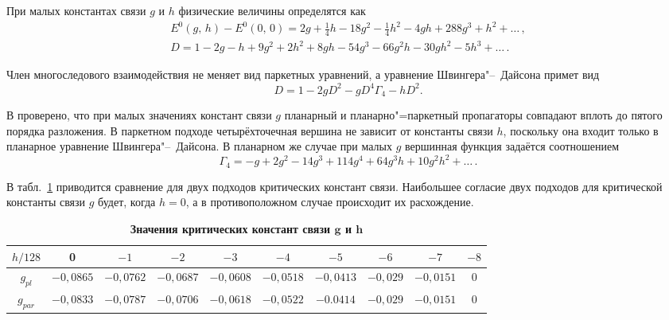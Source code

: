 При малых константах связи $g$ и $h$ физические величины определятся как
\begin{gather*}
E^0(g,\,h)-E^0(0,\,0)=2g+\frac{1}{4} h-18g^2-\frac{1}{4}
h^2-4g h + 288g^3 + h^2+ \ldots\,,\\
D=1 - 2g - h + 9g^2 + 2 h^2 + 8g h - 54g^3 - 66g^2 h - 30gh^2 - 5 h^3+ \ldots\, .
\end{gather*}

Член многоследового взаимодействия не меняет вид паркетных
уравнений, а уравнение Швингера"--~Дайсона примет вид
\begin{equation*}
D=1-2gD^2-gD^4\Gamma_4-hD^2.
\end{equation*}

В \cite{shish:sh1} проверено, что при малых значениях констант связи $g$ планарный и планарно"=паркетный пропагаторы совпадают
вплоть до пятого порядка разложения. В паркетном подходе четырёхточечная вершина не зависит от константы связи $h$, поскольку она
входит только в планарное уравнение Швингера"--~Дайсона. В планарном же случае  при малых $g$ вершинная функция задаётся
соотношением
\begin{equation*}
\Gamma_4=-g+2g^2-14g^3+114g^4+64g^3 h+10g^2 h^2+\dots\,.
\end{equation*}

В  табл.~\ref{sisk:1} приводится сравнение для двух подходов критических констант связи.
Наибольшее согласие двух подходов для критической константы связи
$g$ будет, когда $h=0$, а в противоположном случае происходит их
расхождение.

\begin{table}[h!]
\setlength{\tabcolsep}{3.5pt}
\centering \small
\caption{\bf Значения критических констант связи $\boldsymbol g$ и $\boldsymbol h$\label{sisk:1}} \vspace{-3mm}
\begin{tabular}{c|ccccccccc} \hline
\scriptsize $h/128$ &\scriptsize 0 &\scriptsize $-1$ &\scriptsize $-2$ &\scriptsize $-3$ &\scriptsize $-4$ &\scriptsize $-5$ &\scriptsize $-6$ &\scriptsize $-7$ &\scriptsize $-8$ \\  \hline
\rule{0mm}{12pt}%
\scriptsize $g_{pl}$\small & $-0,0865$ & $-0,0762$ & $-0,0687$ &  $-0,0608$ & $-0,0518$ &
$-0,0413$ & $-0,029$ & $-0,0151$ & 0 \\ %
\scriptsize $g_{par}$ & $-0,0833$ & $-0,0787$ & $-0,0706$ & $-0,0618$ & $-0,0522$ &
 $-0.0414$ & $-0,029$  & $-0,0151$ & 0 \\ \hline
 \end{tabular}
\end{table}


